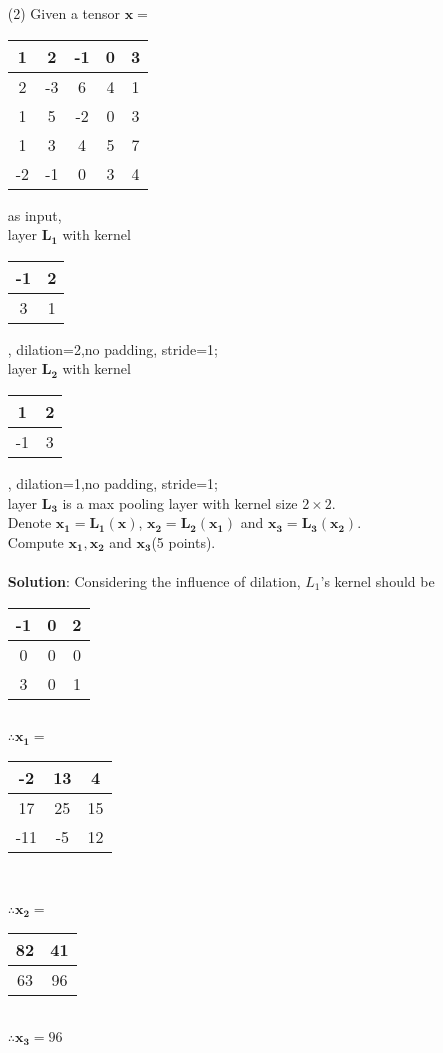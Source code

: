 \documentclass{article}
\begin{document}
\begin{enumerate}
\begin{itemize}
        
        \item[(2)] Given a tensor $\bm{x=}$
\begin{tabular}{|c|c|c|c|c|}
\hline
1&2&-1&0&3\\
\hline 
2&-3&6&4&1\\
\hline
1&5&-2&0&3\\
\hline
1&3&4&5&7\\
\hline
-2&-1&0&3&4\\
\hline
\end{tabular} as input,\\
layer $\bm{L_1}$ with kernel 
\begin{tabular}{|c|c|}
\hline
-1&2\\
\hline 
3&1\\
\hline
\end{tabular}, dilation=2,no padding, stride=1; \\
layer $\bm{L_2}$ with kernel 
\begin{tabular}{|c|c|}
\hline
1&2\\
\hline 
-1&3\\
\hline
\end{tabular}, dilation=1,no padding, stride=1;\\
layer $\bm{L_3}$ is a max pooling layer with kernel size $2\times2$.\\
Denote $\bm{x_1}=\bm{L_1(x)}$, $\bm{x_2}=\bm{L_2(x_1)}$ and $\bm{x_3}=\bm{L_3(x_2)}$.\\ Compute $\bm{x_1,x_2}$ and $\bm{x_3}$(5 points).
\\\\    
\textbf{Solution}:
Considering the influence of dilation, $L_1$'s kernel should be 
\begin{tabular}{|c|c|c|}
	\hline
	-1&0&2\\
	\hline 
	0&0&0\\
	\hline
	3&0&1\\
	\hline
\end{tabular}\\
$\therefore \bm {x_1}=$
\begin{tabular}{|c|c|c|}
	\hline
	-2&13&4\\
	\hline 
	17&25&15\\
	\hline
	-11&-5&12\\
	\hline
\end{tabular}\\\\
$\therefore \bm{x_2}=$
\begin{tabular}{|c|c|}
	\hline
	82&41\\
	\hline
	63&96\\
	\hline
\end{tabular}\\
$\therefore \bm {x_3}=96$ 
\end{itemize}


\end{enumerate}
\end{document}
